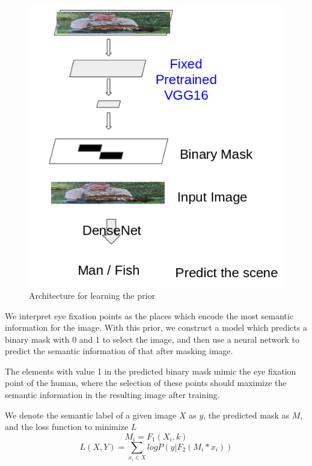 \documentclass[10pt,twocolumn,letterpaper]{article}
\begin{document}
 \begin{figure}
 	\begin{center}
 		\includegraphics[width=\columnwidth]{figures/Prior.png}
 		
 	\end{center}
 	\caption{Architecture for learning the prior}
 	\label{fig:prior}
 \end{figure}
 
 We interpret eye fixation points as the places which encode the most semantic
 information for the image. With this prior, we construct a model which
 predicts a binary mask with 0 and 1 to select the image, and then use a neural
 network to predict the semantic information of that after masking image. 
 
 The elements with value 1 in the predicted binary mask mimic the eye fixation point of the human, where the selection of these points should maximize the semantic information in the resulting image after training.
 
 We denote the semantic label of a given image $X$ as $y$, the predicted mask as $M$, and the loss function to minimize $L$
 $$M_i = F_1(X_i, k)$$
 $$L(X, Y) = \sum_{x_i \in X}{logP(y | F_2(M_i * x_i))}$$
 
\end{document}
